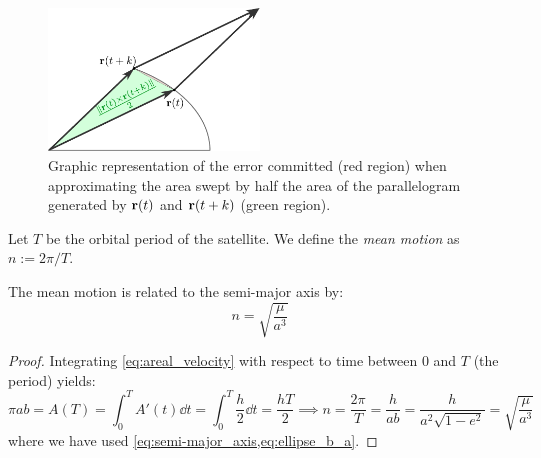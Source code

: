 \documentclass[../main.tex]{subfiles}
\begin{document}
\begin{figure}[htbp]
  \centering
  \includegraphics[width=0.5\textwidth]{Images/areal_velocity.pdf}
  \caption{Graphic representation of the error committed (red region) when approximating the area swept by half the area of the parallelogram generated by $\boldsymbol{\mathrm{r}}(t)$ and $\boldsymbol{\mathrm{r}}(t+k)$ (green region).}
  \label{fig:areal_vel}
\end{figure}
\begin{definition}
  Let $T$ be the orbital period of the satellite. We define the \emph{mean motion} as $n:=2\pi/T$.
\end{definition}
\begin{proposition}\label{prop:kepler_third_law}
  The mean motion is related to the semi-major axis by:
  \begin{equation}
    n=\sqrt{\frac{\mu}{a^3}}
  \end{equation}
\end{proposition}
\begin{proof}
  Integrating \cref{eq:areal_velocity} with respect to time between 0 and $T$ (the period) yields:
  \begin{equation}
    \pi a b=A(T)=\int_0^T A'(t)\dd{t}=\int_0^T \frac{h}{2}\dd{t}=\frac{hT}{2}\implies n=\frac{2\pi}{T}=\frac{h}{a b}=\frac{h}{a^2\sqrt{1-e^2}}=\sqrt{\frac{\mu}{a^3}}
  \end{equation}
  where we have used \cref{eq:semi-major_axis,eq:ellipse_b_a}.
\end{proof}
\end{document}
